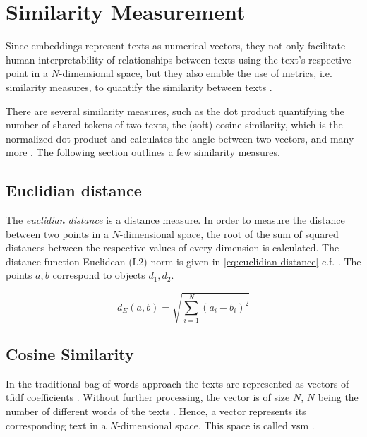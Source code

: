 
\section{Similarity Measurement}\label{sec:similarity-measurement}

Since embeddings represent texts as numerical vectors, they not only facilitate human interpretability of relationships between texts using 
the text's respective point in a $N$-dimensional space, 
but they also enable the use of metrics, i.e. similarity measures, to quantify the similarity between texts \cite{IR2011, euclidean_l2_norm2015}.

There are several similarity measures, such as the dot product quantifying the number of shared tokens of two texts, 
the (soft) cosine similarity, which is the normalized dot product and calculates the angle between two vectors, 
and many more \cite{IR2011, euclidean_l2_norm2015, HfsentTrans2019}.
The following section outlines a few similarity measures.


\subsection{Euclidian distance}\label{subsec:euclidian-distance}

The \textit{euclidian distance} is a distance measure.
In order to measure the distance between two points in a $N$-dimensional space, 
the root of the sum of squared distances between the respective values of every dimension is calculated.
The distance function Euclidean (L2) norm is given in \autoref{eq:euclidian-distance} c.f. \cite{euclidean_l2_norm2015}.
The points $a, b$ correspond to objects $d_1, d_2$.

\begin{equation}
    d_E(a,b) = \sqrt{\sum_{i=1}^{N}(a_i - b_i)^2}
    \label{eq:euclidian-distance}
\end{equation}


\subsection{Cosine Similarity}\label{subsec:cosine-similarity}

In the traditional bag-of-words approach the texts are represented as vectors of \ac{tfidf} coefficients \cite{soft_cosine2017}.
Without further processing, the vector is of size $N$, $N$ being the number of different words of the texts \cite{soft_cosine2017}.
Hence, a vector represents its corresponding text in a $N$-dimensional space.
This space is called \ac{vsm} \cite{soft_cosine2014}.

